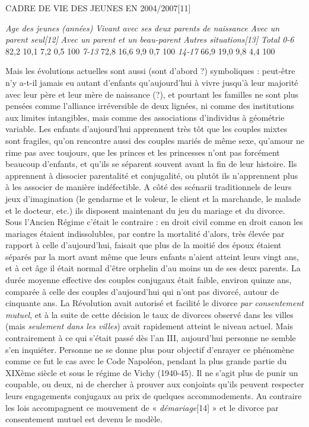  CADRE DE VIE DES JEUNES EN 2004/2007[11]
 
\emph{Age des jeunes (années)}
\emph{Vivant avec ses deux parents de naissance}
\emph{Avec un parent seul[12]}
\emph{Avec un parent et un beau-parent}
\emph{Autres situations[13]}
\emph{Total}
\emph{0-6}
82,2
10,1
7,2
0,5
100%
\emph{7-13}
72,8
16,6
9,9
0,7
100%
\emph{14-17}
66,9
19,0
9,8
4,4
100%
 
 Mais les évolutions actuelles sont aussi (sont d'abord ?) symboliques : peut-être n'y a-t-il jamais eu autant d'enfants qu'aujourd'hui à vivre jusqu'à leur majorité avec leur père et leur mère de naissance (?), et pourtant les familles ne sont plus pensées comme l'alliance irréversible de deux lignées, ni comme des institutions aux limites intangibles, mais comme des associations d'individus à géométrie variable. Les enfants d'aujourd'hui apprennent très tôt que les couples mixtes sont fragiles, qu'on rencontre aussi des couples mariés de même sexe, qu'amour ne rime pas avec toujours, que les princes et les princesses n'ont pas forcément beaucoup d'enfants, et qu'ils se séparent souvent avant la fin de leur histoire. Ils apprennent à dissocier parentalité et conjugalité, ou plutôt ils n'apprennent plus à les associer de manière indéfectible. A côté des scénarii traditionnels de leurs jeux d'imagination (le gendarme et le voleur, le client et la marchande, le malade et le docteur, etc.) ils disposent maintenant du jeu du mariage et du divorce.
 Sous l'Ancien Régime c'était le contraire : en droit civil comme en droit canon les mariages étaient indissolubles, par contre la mortalité d'alors, très élevée par rapport à celle d'aujourd'hui, faisait que plus de la moitié des époux étaient séparés par la mort avant même que leurs enfants n'aient atteint leurs vingt ans, et à cet âge il était normal d'être orphelin d'au moins un de ses deux parents. La durée moyenne effective des couples conjugaux était faible, environ quinze ans, comparée à celle des couples d'aujourd'hui qui n'ont pas divorcé, autour de cinquante ans. 
 La Révolution avait autorisé et facilité le divorce \emph{par consentement mutuel}, et à la suite de cette décision le taux de divorces observé dans les villes (mais \emph{seulement dans les villes}) avait rapidement atteint le niveau actuel. Mais contrairement à ce qui s'était passé dès l'an III, aujourd'hui personne ne semble s'en inquiéter. Personne ne se donne plus pour objectif d'enrayer ce phénomène comme ce fut le cas avec le Code Napoléon, pendant la plus grande partie du XIXème siècle et sous le régime de Vichy (1940-45). Il ne s'agit plus de punir un coupable, ou deux, ni de chercher à prouver aux conjoints qu'ils peuvent respecter leurs engagements conjugaux au prix de quelques accommodements. Au contraire les lois accompagnent ce mouvement de « \emph{démariage}[14] » et le divorce par consentement mutuel est devenu le modèle. 
